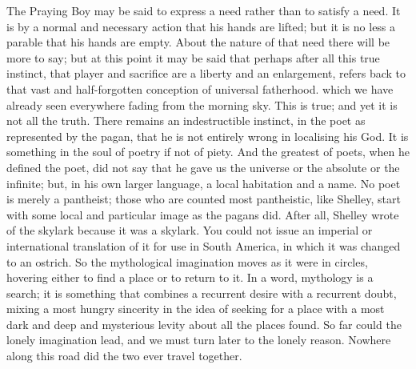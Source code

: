 The Praying Boy may be said to express a need rather than to satisfy a need. It is by a normal and necessary action that his hands are lifted; but it is no less a parable that his hands are empty. About the nature of that need there will be more to say; but at this point it may be said that perhaps after all this true instinct, that player and sacrifice are a liberty and an enlargement, refers back to that vast and half-forgotten conception of universal fatherhood. which we have already seen everywhere fading from the morning sky. This is true; and yet it is not all the truth. There remains an indestructible instinct, in the poet as represented by the pagan, that he is not entirely wrong in localising his God. It is something in the soul of poetry if not of piety. And the greatest of poets, when he defined the poet, did not say that he gave us the universe or the absolute or the infinite; but, in his own larger language, a local habitation and a name. No poet is merely a pantheist; those who are counted most pantheistic, like Shelley, start with some local and particular image as the pagans did. After all, Shelley wrote of the skylark because it was a skylark. You could not issue an imperial or international translation of it for use in South America, in which it was changed to an ostrich. So the mythological imagination moves as it were in circles, hovering either to find a place or to return to it. In a word, mythology is a search; it is something that combines a recurrent desire with a recurrent doubt, mixing a most hungry sincerity in the idea of seeking for a place with a most dark and deep and mysterious levity about all the places found. So far could the lonely imagination lead, and we must turn later to the lonely reason. Nowhere along this road did the two ever travel together.

